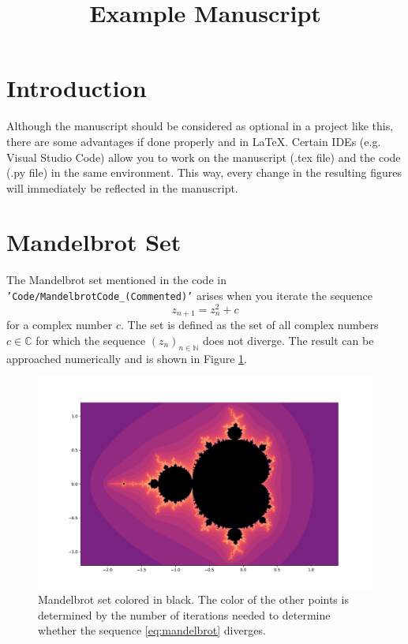 \documentclass{article}
\title{Example Manuscript}
\newcommand{\code}[1]{{\texttt{#1}}}
\begin{document}
\section*{Introduction}

Although the manuscript should be considered as optional in a project like this, there are some advantages if done properly and in \LaTeX. Certain IDEs (e.g. Visual Studio Code) allow you to work on the manuscript (.tex file) and the code (.py file) in the same environment. This way, every change in the resulting figures will immediately be reflected in the manuscript. 

\section*{Mandelbrot Set}

The Mandelbrot set mentioned in the code in \code{'Code/MandelbrotCode\_(Commented)'} arises when you iterate the sequence 
\begin{equation}
    \label{eq:mandelbrot}
    z_{n+1} = z_n^2 + c
\end{equation}
for a complex number $c$. The set is defined as the set of all complex numbers $c \in \mathbb{C}$ for which the sequence $(z_n)_{n\in \mathbb{N}}$ does not diverge. The result can be approached numerically and is shown in Figure \ref{fig:mandelbrot}.

\begin{figure}
    \centering
    \includegraphics[width=\linewidth]{../Results/Figures/Mandelbrot.pdf}
    \caption{Mandelbrot set colored in black. The color of the other points is determined by the number of iterations needed to determine whether the sequence \eqref{eq:mandelbrot} diverges.}
    \label{fig:mandelbrot}
\end{figure}
\end{document}
